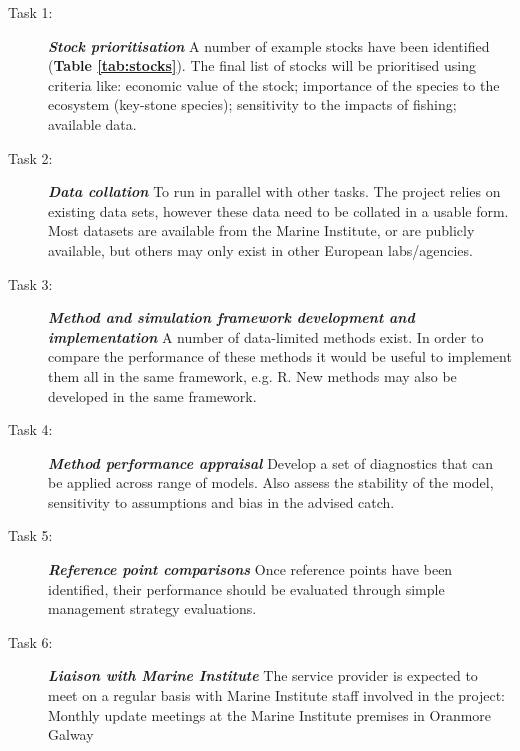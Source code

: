 \documentclass[a4paper, 10pt]{article}
\begin{document}
\begin{description}
 \item[Task 1:] \textbf{\textit{Stock prioritisation}} A number of example stocks have been identified (\textbf{Table \ref{tab:stocks}}). The final list of stocks will be prioritised using criteria like: economic value of the stock; importance of the species to the ecosystem (key-stone species); sensitivity to the impacts of fishing; available data. 
 \item[Task 2:] \textbf{\textit{Data collation}} To run in parallel with other tasks. The project relies on existing data sets, however these data need to be collated in a usable form. Most datasets are available from the Marine Institute, or are publicly available, but others may only exist in other European labs/agencies. 
 \item[Task 3:] \textbf{\textit{Method and simulation framework development and implementation}} A number of data-limited methods exist. In order to compare the performance of these methods it would be useful to implement them all in the same framework, e.g. R. New methods may also be developed in the same framework. 
 \item[Task 4:] \textbf{\textit{Method performance appraisal}} Develop a set of diagnostics that can be applied across range of models. Also assess the stability of the model, sensitivity to assumptions and bias in the advised catch. 
 \item[Task 5:] \textbf{\textit{Reference point comparisons}} Once reference points have been identified, their performance should be evaluated through simple management strategy evaluations. 
 \item[Task 6:] \textbf{\textit{Liaison with Marine Institute}} The service provider is expected to meet on a regular basis with Marine Institute staff involved in the project: Monthly update meetings at the Marine Institute premises in Oranmore Galway 

\end{description}
\end{document}
